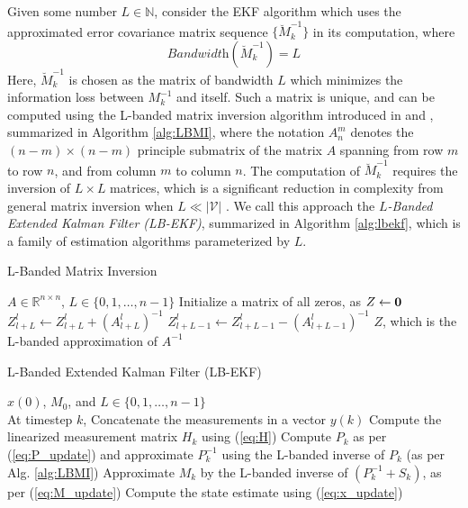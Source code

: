 \documentclass[twocolumn]{article}
\theoremstyle{plain}
\theoremstyle{definition}
\theoremstyle{definition}
\theoremstyle{remark}
\begin{document}
Given some number $L\in \mathbb N$, consider the EKF algorithm which uses the approximated error covariance matrix sequence $\lbrace \breve M^{-1}_k \rbrace$ in its computation, where
\[
\textit{Bandwidth}(\breve M^{-1}_k) = L
\]
Here, $\breve M^{-1}_k$ is chosen as the matrix of bandwidth $L$ which minimizes the information loss between $M^{-1}_k$ and itself. Such a matrix is unique, and can be computed using the L-banded matrix inversion algorithm introduced in \cite{kavcic2000matrices} and \cite{moura2008distributing}, summarized in Algorithm \ref{alg:LBMI}, where the notation $A^{m}_{n}$ denotes the $(n-m) \times (n-m)$ principle submatrix of the matrix $A$ spanning from row $m$ to row $n$, and from column $m$ to column $n$. The computation of $\breve M^{-1}_k$ requires the inversion of $L \times L$ matrices, which is a significant reduction in complexity from general matrix inversion when $L \ll |\mathcal V|$ \cite[Section 3]{kavcic2000matrices}.
We call this approach the \textit{$L$-Banded Extended Kalman Filter (LB-EKF)}, summarized in Algorithm \ref{alg:lbekf}, which is a family of estimation algorithms parameterized by $L$. 
\begin{algorithm}
\caption{L-Banded Matrix Inversion}
\begin{algorithmic}[1]
\REQUIRE $A \in \mathbb R^{n \times n}$, $L \in \lbrace 0, 1, \dots, n-1\rbrace$
\STATE Initialize a matrix of all zeros, as $Z \leftarrow \bold 0$
\STATE $Z^{l}_{l+L} \leftarrow Z^{l}_{l+L} + (A^{l}_{l+L})^{-1}$
\ENDFOR
{}
\STATE $Z^l_{l+L-1} \leftarrow Z^l_{l+L-1} - (A^l_{l+L-1})^{-1}$
\ENDFOR
\RETURN $Z$, which is the L-banded approximation of $A^{-1}$
\end{algorithmic}
\label{alg:LBMI}
\end{algorithm}
\begin{algorithm}
\caption{L-Banded Extended Kalman Filter (LB-EKF)}
\begin{algorithmic}[1]
\REQUIRE $\hat x(0)$, $M_0$, and  $L \in \lbrace 0, 1, \dots, n-1\rbrace$\\
\hspace{-15pt} At timestep $k$,
\STATE Concatenate the measurements in a vector $y(k)$
\STATE Compute the linearized measurement matrix $H_k$ using (\ref{eq:H})
\STATE Compute $P_k$ as per (\ref{eq:P_update}) and approximate $P_k^{-1}$ using the L-banded inverse of $P_k$ (as per Alg. \ref{alg:LBMI})
\STATE Approximate $M_{k}$ by the L-banded inverse of $(P_k^{-1}+S_k)$, as per (\ref{eq:M_update})
\STATE Compute the state estimate using (\ref{eq:x_update})
\end{algorithmic}
\label{alg:lbekf}
\end{algorithm}
\end{document}
